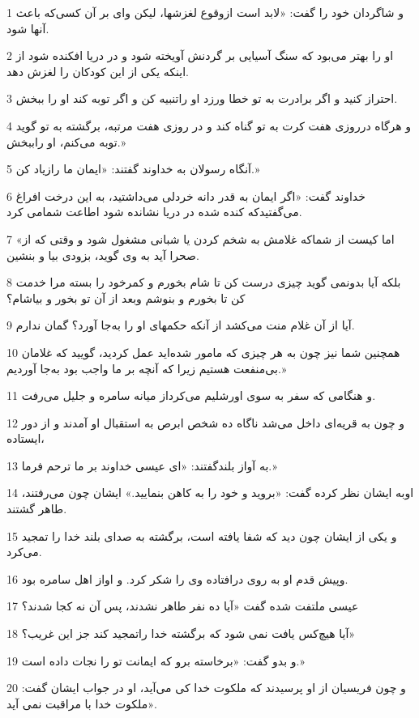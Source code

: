 \par 1 و شاگردان خود را گفت: «لابد است ازوقوع لغزشها، لیکن وای بر آن کسی‌که باعث آنها شود.
\par 2 او را بهتر می‌بود که سنگ آسیایی بر گردنش آویخته شود و در دریا افکنده شود از اینکه یکی از این کودکان را لغزش دهد.
\par 3 احتراز کنید و اگر برادرت به تو خطا ورزد او راتنبیه کن و اگر توبه کند او را ببخش.
\par 4 و هرگاه درروزی هفت کرت به تو گناه کند و در روزی هفت مرتبه، برگشته به تو گوید توبه می‌کنم، او راببخش.»
\par 5 آنگاه رسولان به خداوند گفتند: «ایمان ما رازیاد کن.»
\par 6 خداوند گفت: «اگر ایمان به قدر دانه خردلی می‌داشتید، به این درخت افراغ می‌گفتیدکه کنده شده در دریا نشانده شود اطاعت شمامی کرد.
\par 7 «اما کیست از شماکه غلامش به شخم کردن یا شبانی مشغول شود و وقتی که از صحرا آید به وی گوید، بزودی بیا و بنشین.
\par 8 بلکه آیا بدونمی گوید چیزی درست کن تا شام بخورم و کمرخود را بسته مرا خدمت کن تا بخورم و بنوشم وبعد از آن تو بخور و بیاشام؟
\par 9 آیا از آن غلام منت می‌کشد از آنکه حکمهای او را به‌جا آورد؟ گمان ندارم.
\par 10 همچنین شما نیز چون به هر چیزی که مامور شده‌اید عمل کردید، گویید که غلامان بی‌منفعت هستیم زیرا که آنچه بر ما واجب بود به‌جا آوردیم.»
\par 11 و هنگامی که سفر به سوی اورشلیم می‌کرداز میانه سامره و جلیل می‌رفت.
\par 12 و چون به قریه‌ای داخل می‌شد ناگاه ده شخص ابرص به استقبال او آمدند و از دور ایستاده،
\par 13 به آواز بلندگفتند: «ای عیسی خداوند بر ما ترحم فرما.»
\par 14 اوبه ایشان نظر کرده گفت: «بروید و خود را به کاهن بنمایید.» ایشان چون می‌رفتند، طاهر گشتند.
\par 15 و یکی از ایشان چون دید که شفا یافته است، برگشته به صدای بلند خدا را تمجید می‌کرد.
\par 16 وپیش قدم او به روی در‌افتاده وی را شکر کرد. و اواز اهل سامره بود.
\par 17 عیسی ملتفت شده گفت «آیا ده نفر طاهر نشدند، پس آن نه کجا شدند؟
\par 18 آیا هیچ‌کس یافت نمی شود که برگشته خدا راتمجید کند جز این غریب؟»
\par 19 و بدو گفت: «برخاسته برو که ایمانت تو را نجات داده است.»
\par 20 و چون فریسیان از او پرسیدند که ملکوت خدا کی می‌آید، او در جواب ایشان گفت: «ملکوت خدا با مراقبت نمی آید.
